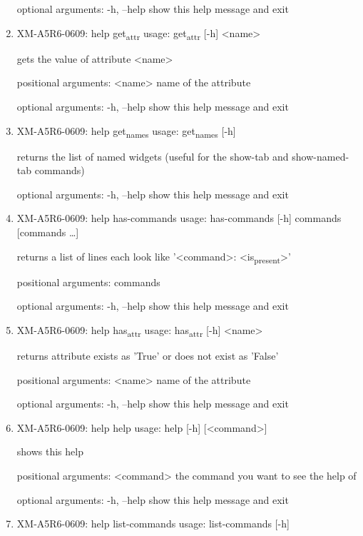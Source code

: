 \documentclass[11pt]{article}
\begin{document}
\begin{enumerate}
optional arguments:
  -h, --help  show this help message and exit

\item XM-A5R6-0609: help get\textsubscript{attr}
\label{sec:org61fbb80}
usage: get\textsubscript{attr} [-h] <name>

gets the value of attribute <name>

positional arguments:
  <name>      name of the attribute

optional arguments:
  -h, --help  show this help message and exit

\item XM-A5R6-0609: help get\textsubscript{names}
\label{sec:org03c6af3}
usage: get\textsubscript{names} [-h]

returns the list of named widgets (useful for the show-tab and show-named-tab
commands)

optional arguments:
  -h, --help  show this help message and exit

\item XM-A5R6-0609: help has-commands
\label{sec:org5992311}
usage: has-commands [-h] commands [commands \ldots{}]

returns a list of lines each look like '<command>: <is\textsubscript{present}>'

positional arguments:
  commands

optional arguments:
  -h, --help  show this help message and exit

\item XM-A5R6-0609: help has\textsubscript{attr}
\label{sec:org2a3c4ca}
usage: has\textsubscript{attr} [-h] <name>

returns attribute exists as 'True' or does not exist as 'False'

positional arguments:
  <name>      name of the attribute

optional arguments:
  -h, --help  show this help message and exit

\item XM-A5R6-0609: help help
\label{sec:org23b814b}
usage: help [-h] [<command>]

shows this help

positional arguments:
  <command>   the command you want to see the help of

optional arguments:
  -h, --help  show this help message and exit

\item XM-A5R6-0609: help list-commands
\label{sec:org2f6875e}
usage: list-commands [-h]


\end{enumerate}
\end{document}
